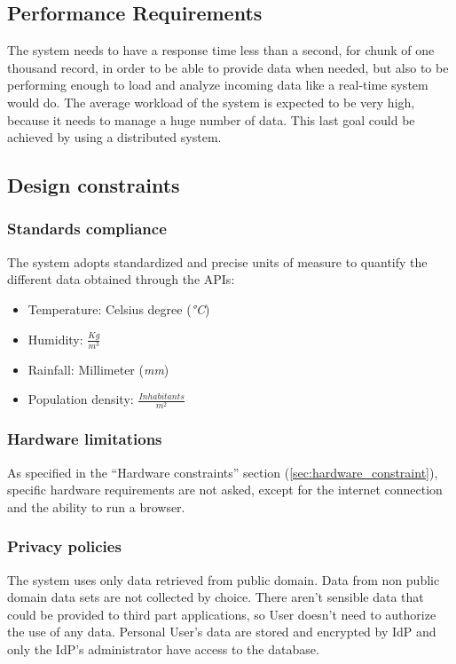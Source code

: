 \subsection{Performance Requirements}
The system needs to have a response time less than a second, for chunk of one thousand record, in order to be able to provide data when needed, but also to be performing enough to load and analyze incoming data like a real-time system would do.
The average workload of the system is expected to be very high, because it needs to manage a huge number of data. This last goal could be achieved by using a distributed system.

\subsection{Design constraints}
\subsubsection{Standards compliance}
The	system adopts standardized and precise units of measure to quantify the different data obtained through the APIs:
\begin{itemize}
    \item Temperature: Celsius degree (\textit{°C})
    \item Humidity: $\frac{Kg}{m^3}$
    \item Rainfall: Millimeter (\textit{mm})
    \item Population density: $\frac{Inhabitants}{m^2}$
\end{itemize}

\subsubsection{Hardware limitations}
As specified in the “Hardware constraints” section ({\ref{sec:hardware_constraint}}), specific hardware requirements are not asked, except for the internet connection and the ability to run a browser.

\subsubsection{Privacy policies}
The system uses only data retrieved from public domain. Data from non public domain data sets are not collected by choice. There aren't sensible data that could be provided to third part applications, so User doesn't need to authorize the use of any data. 
Personal User's data are stored and encrypted by IdP and only the IdP's administrator have access to the database.